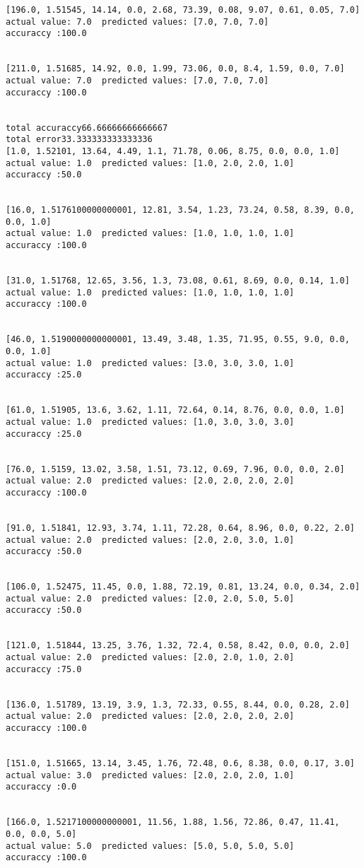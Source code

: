 \documentclass[11pt]{article}
\begin{document}
\begin{Verbatim}[commandchars=\\\{\}]
[196.0, 1.51545, 14.14, 0.0, 2.68, 73.39, 0.08, 9.07, 0.61, 0.05, 7.0]
actual value: 7.0  predicted values: [7.0, 7.0, 7.0]
accuraccy :100.0


[211.0, 1.51685, 14.92, 0.0, 1.99, 73.06, 0.0, 8.4, 1.59, 0.0, 7.0]
actual value: 7.0  predicted values: [7.0, 7.0, 7.0]
accuraccy :100.0


total accuraccy66.66666666666667
total error33.333333333333336
[1.0, 1.52101, 13.64, 4.49, 1.1, 71.78, 0.06, 8.75, 0.0, 0.0, 1.0]
actual value: 1.0  predicted values: [1.0, 2.0, 2.0, 1.0]
accuraccy :50.0


[16.0, 1.5176100000000001, 12.81, 3.54, 1.23, 73.24, 0.58, 8.39, 0.0, 0.0, 1.0]
actual value: 1.0  predicted values: [1.0, 1.0, 1.0, 1.0]
accuraccy :100.0


[31.0, 1.51768, 12.65, 3.56, 1.3, 73.08, 0.61, 8.69, 0.0, 0.14, 1.0]
actual value: 1.0  predicted values: [1.0, 1.0, 1.0, 1.0]
accuraccy :100.0


[46.0, 1.5190000000000001, 13.49, 3.48, 1.35, 71.95, 0.55, 9.0, 0.0, 0.0, 1.0]
actual value: 1.0  predicted values: [3.0, 3.0, 3.0, 1.0]
accuraccy :25.0


[61.0, 1.51905, 13.6, 3.62, 1.11, 72.64, 0.14, 8.76, 0.0, 0.0, 1.0]
actual value: 1.0  predicted values: [1.0, 3.0, 3.0, 3.0]
accuraccy :25.0


[76.0, 1.5159, 13.02, 3.58, 1.51, 73.12, 0.69, 7.96, 0.0, 0.0, 2.0]
actual value: 2.0  predicted values: [2.0, 2.0, 2.0, 2.0]
accuraccy :100.0


[91.0, 1.51841, 12.93, 3.74, 1.11, 72.28, 0.64, 8.96, 0.0, 0.22, 2.0]
actual value: 2.0  predicted values: [2.0, 2.0, 3.0, 1.0]
accuraccy :50.0


[106.0, 1.52475, 11.45, 0.0, 1.88, 72.19, 0.81, 13.24, 0.0, 0.34, 2.0]
actual value: 2.0  predicted values: [2.0, 2.0, 5.0, 5.0]
accuraccy :50.0


[121.0, 1.51844, 13.25, 3.76, 1.32, 72.4, 0.58, 8.42, 0.0, 0.0, 2.0]
actual value: 2.0  predicted values: [2.0, 2.0, 1.0, 2.0]
accuraccy :75.0


[136.0, 1.51789, 13.19, 3.9, 1.3, 72.33, 0.55, 8.44, 0.0, 0.28, 2.0]
actual value: 2.0  predicted values: [2.0, 2.0, 2.0, 2.0]
accuraccy :100.0


[151.0, 1.51665, 13.14, 3.45, 1.76, 72.48, 0.6, 8.38, 0.0, 0.17, 3.0]
actual value: 3.0  predicted values: [2.0, 2.0, 2.0, 1.0]
accuraccy :0.0


[166.0, 1.5217100000000001, 11.56, 1.88, 1.56, 72.86, 0.47, 11.41, 0.0, 0.0, 5.0]
actual value: 5.0  predicted values: [5.0, 5.0, 5.0, 5.0]
accuraccy :100.0



\end{Verbatim}
\end{document}
